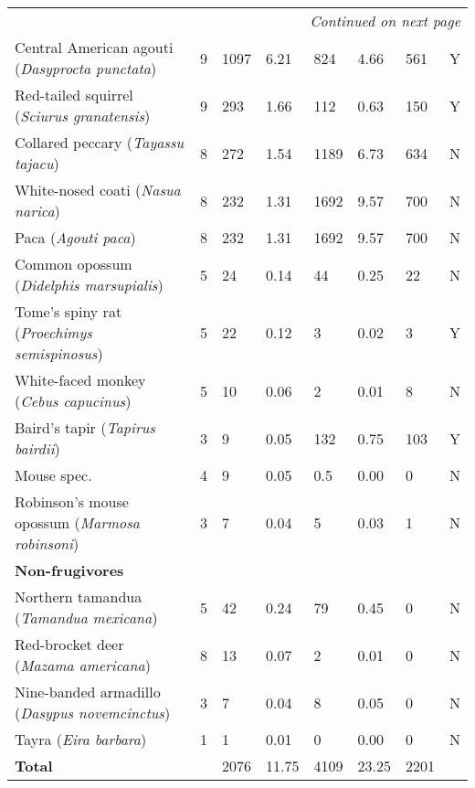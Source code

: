 \documentclass[b5paper,justified]{tufte-book} %
\begin{document}
\begin{fullwidth}
\begin{landscape}
\begin{longtable}{@{}p{7cm}p{1cm}p{1cm}p{1cm}p{1cm}p{1cm}p{1cm}p{1cm}}
\hline
\endhead
\hline \multicolumn{8}{r}{\emph{Continued on next page}}
\endfoot
\endlastfoot

\multicolumn{8}{l}{\textbf{Frugivores}} \\
Central American agouti (\textit{Dasyprocta punctata}) & 9 & 1097 & 6.21 & 824 & 4.66 & 561 & Y \\
Red-tailed squirrel (\textit{Sciurus granatensis}) & 9 & 293 & 1.66 & 112 & 0.63 & 150 & Y \\
Collared peccary (\textit{Tayassu tajacu}) & 8 & 272 & 1.54 & 1189 & 6.73 & 634 & N \\
White-nosed coati (\textit{Nasua narica}) & 8 & 232 & 1.31 & 1692 & 9.57 & 700 & N \\
Paca (\textit{Agouti paca}) & 8 & 232 & 1.31 & 1692 & 9.57 & 700 & N \\
Common opossum (\textit{Didelphis marsupialis}) & 5 & 24 & 0.14 & 44 & 0.25 & 22 & N \\
Tome's spiny rat (\textit{Proechimys semispinosus}) & 5 & 22 & 0.12 & 3 & 0.02 & 3 & Y \\
White-faced monkey (\textit{Cebus capucinus}) & 5 & 10 & 0.06 & 2 & 0.01 & 8 & N \\
Baird's tapir (\textit{Tapirus bairdii}) & 3 & 9 & 0.05 & 132 & 0.75 & 103 & Y \\
Mouse spec.& 4 & 9 & 0.05 & 0.5 & 0.00 & 0 & N \\
Robinson's mouse opossum (\textit{Marmosa robinsoni}) & 3 & 7 & 0.04 & 5 & 0.03 & 1 & N \\

\multicolumn{8}{l}{\textbf{Non-frugivores}} \\
Northern tamandua (\textit{Tamandua mexicana}) & 5 & 42 & 0.24 & 79 & 0.45 & 0 & N \\
Red-brocket deer (\textit{Mazama americana}) & 8 & 13 & 0.07 & 2 & 0.01 & 0 & N \\
Nine-banded armadillo (\textit{Dasypus novemcinctus}) & 3 & 7 & 0.04 & 8 & 0.05 & 0 & N\\
Tayra (\textit{Eira barbara}) & 1 & 1 & 0.01 & 0 & 0.00 & 0 & N \\
\multicolumn{2}{l}{\textbf{Total}} & 2076 & 11.75 & 4109 & 23.25 & 2201 & {} \\
\bottomrule

\end{longtable}
\end{landscape}



\end{fullwidth}
\end{document}
